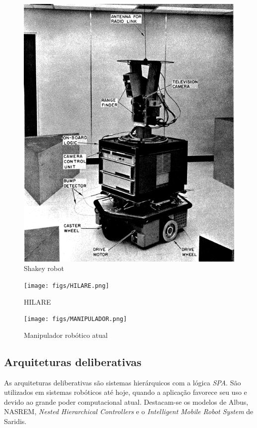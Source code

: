 \begin{figure}[H]
\centering
\includegraphics[width=1\columnwidth]{figs/SHAKEY_1.png}
\caption{Shakey robot}
\label{SHAKEY_1}
\end{figure}

\begin{figure}[H]
\centering
\texttt{[image: figs/HILARE.png]}
\caption{HILARE}
\label{hilare}
\end{figure}

\begin{figure}[H]
\centering
\texttt{[image: figs/MANIPULADOR.png]}
\caption{Manipulador robótico atual}
\label{manipulador}
\end{figure}

\subsection{Arquiteturas deliberativas}
As arquiteturas deliberativas são sistemas hierárquicos com a lógica
\textit{SPA}. São utilizados em sistemas robóticos até hoje, quando a aplicação
favorece seu uso e devido ao grande poder computacional atual. Destacam-se os modelos de Albus,
NASREM, \textit{Nested Hierarchical Controllers} e o \emph{Intelligent Mobile
Robot System} de Saridis.


